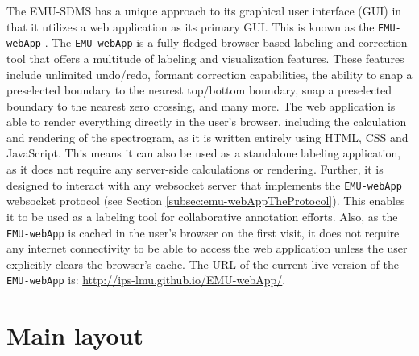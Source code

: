 \documentclass[
]{book}
\begin{document}
The EMU-SDMS has a unique approach to its graphical user interface (GUI) in that it utilizes a web application as its primary GUI. This is known as the \texttt{EMU-webApp} \citep{winkelmann:2015d}. The \texttt{EMU-webApp} is a fully fledged browser-based labeling and correction tool that offers a multitude of labeling and visualization features. These features include unlimited undo/redo, formant correction capabilities, the ability to snap a preselected boundary to the nearest top/bottom boundary, snap a preselected boundary to the nearest zero crossing, and many more. The web application is able to render everything directly in the user's browser, including the calculation and rendering of the spectrogram, as it is written entirely using HTML, CSS and JavaScript. This means it can also be used as a standalone labeling application, as it does not require any server-side calculations or rendering. Further, it is designed to interact with any websocket server that implements the \texttt{EMU-webApp} websocket protocol (see Section \ref{subsec:emu-webAppTheProtocol}). This enables it to be used as a labeling tool for collaborative annotation efforts. Also, as the \texttt{EMU-webApp} is cached in the user's browser on the first visit, it does not require any internet connectivity to be able to access the web application unless the user explicitly clears the browser's cache. The URL of the current live version of the \texttt{EMU-webApp} is: \url{http://ips-lmu.github.io/EMU-webApp/}.

\hypertarget{sec:emu-webApp-mainLayout}{%
\section{Main layout}\label{sec:emu-webApp-mainLayout}}
\end{document}
